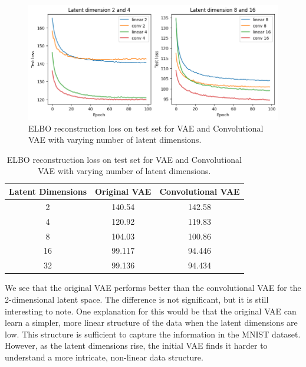 \begin{figure}[h]
\centering
\includegraphics[width=\textwidth]{images/test_loss.png}
\setlength{\belowcaptionskip}{-10pt}
\caption{ELBO reconstruction loss on test set for VAE and Convolutional VAE with varying number of latent dimensions.}
\label{fig:vaeloss}
\end{figure}

\begin{table}
\centering
\begin{tabular}{|c|c|c|}
\hline
\multicolumn{1}{|c|}{\textbf{Latent Dimensions}} & \multicolumn{1}{c|}{\textbf{Original VAE}} & \multicolumn{1}{c|}{\textbf{Convolutional VAE}} \\ \hline
\multicolumn{1}{|c|}{2} & \multicolumn{1}{c|}{140.54} & \multicolumn{1}{c|}{142.58}  \\ \hline
\multicolumn{1}{|c|}{4} & \multicolumn{1}{c|}{120.92} & \multicolumn{1}{c|}{119.83}  \\ \hline
\multicolumn{1}{|c|}{8} & \multicolumn{1}{c|}{104.03} & \multicolumn{1}{c|}{100.86}  \\ \hline
\multicolumn{1}{|c|}{16} & \multicolumn{1}{c|}{99.117} & \multicolumn{1}{c|}{94.446}  \\ \hline
\multicolumn{1}{|c|}{32} & \multicolumn{1}{c|}{99.136} & \multicolumn{1}{c|}{94.434}  \\ \hline
\end{tabular}
\vspace*{0.5cm}
\setlength{\belowcaptionskip}{-10pt}
\caption{ELBO reconstruction loss on test set for VAE and Convolutional VAE with varying number of latent dimensions.}
\label{tab:vaeloss}
\end{table}

We see that the original VAE performs better than the convolutional VAE for the 2-dimensional latent space. The difference is not significant, but it is still interesting to note. One explanation for this would be that the original VAE can learn a simpler, more linear structure of the data when the latent dimensions are low. This structure is sufficient to capture the information in the MNIST dataset. However, as the latent dimensions rise, the initial VAE finds it harder to understand a more intricate, non-linear data structure.

